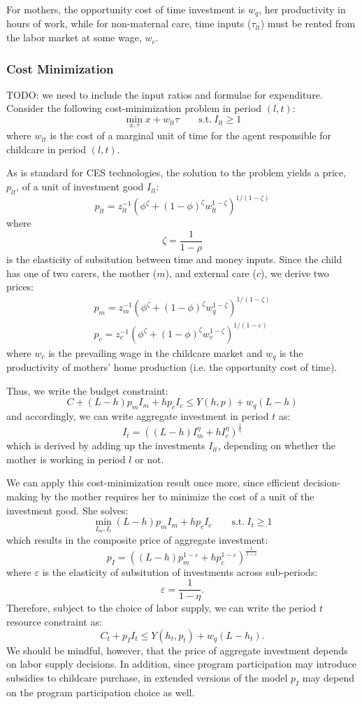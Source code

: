 \documentclass[12pt]{article}
\numberwithin{equation}{section}
\numberwithin{figure}{section}
\numberwithin{table}{section}
\begin{document}
For mothers, the opportunity cost of time investment is $w_{q}$, her productivity in hours of work, while for non-maternal care, time inputs ($\tau_{lt}$) must be rented from the labor market at some wage, $w_c$.

\subsubsection{Cost Minimization}
{\color{red} TODO: we need to include the input ratios and formulae for expenditure.}
Consider the following cost-minimization problem in period $(l,t)$:
\[\min_{x,\tau}x+w_{lt}\tau\qquad\text{s.t.}\ I_{lt}\geq 1 \]
where $w_{lt}$ is the cost of a marginal unit of time for the agent responsible for childcare in period $(l,t)$.

As is standard for CES technologies, the solution to the problem yields a price, $p_{lt}$, of a unit of investment good $I_{lt}$:
\[p_{lt} = z^{-1}_{lt}\left(\phi^\zeta + (1-\phi)^\zeta w_{lt}^{1-\zeta}\right)^{1/(1-\zeta)} \]
where
\[ \zeta = \frac{1}{1-\rho} \]
is the elasticity of subsitution between time and money inputs. Since the child has one of two carers, the mother ($m$), and external care ($c$), we derive two prices:
\begin{eqnarray}
p_m = z_m^{-1}\left(\phi^\zeta + (1-\phi)^\zeta w_q^{1-\zeta}\right)^{1/(1-\zeta)} \\
p_c = z_c^{-1}\left(\phi^\zeta + (1-\phi)^\zeta w_c^{1-\zeta}\right)^{1/(1-\varepsilon)}
\end{eqnarray}
where $w_c$ is the prevailing wage in the childcare market and $w_q$ is the productivity of mothers' home production (i.e. the opportunity cost of time).

Thus, we write the budget constraint:
\[ C + (L-h)p_mI_m + hp_cI_c \leq Y(h,p) + w_q(L-h) \]
and accordingly, we can write aggregate investment in period $t$ as:
\[ I_t = \left((L-h)I_m^\eta + hI_c^\eta\right)^{\frac{1}{\eta}} \]
which is derived by adding up the investments $I_{lt}$, depending on whether the mother is working in period $l$ or not.

We can apply this cost-minimization result once more, since efficient decision-making by the mother requires her to minimize the cost of a unit of the investment good. She solves:
\[ \min_{I_m,I_c}(L-h)p_mI_m + hp_cI_c\qquad\text{s.t.}\ I_t\geq 1 \]
which results in the composite price of aggregate investment:
\[p_I = \left((L-h)p_m^{1-\varepsilon}+hp_c^{1-\varepsilon}\right)^{\frac{1}{1-\varepsilon}} \]
where $\varepsilon$ is the elasticity of subsitution of investments across sub-periods:
\[\varepsilon = \frac{1}{1-\eta}.\]
Therefore, subject to the choice of labor supply, we can write the period $t$ resource constraint as:
\[ C_t + p_II_t \leq Y(h_t,p_t) + w_q(L-h_t) .\]
We should be mindful, however, that the price of aggregate investment depends on labor supply decisions. In addition, since program participation may introduce subsidies to childcare purchase, in extended versions of the model $p_I$ may depend on the program participation choice as well.
\end{document}
